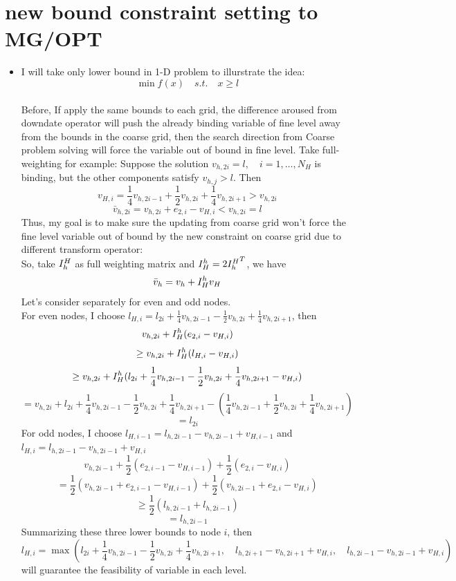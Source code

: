 \documentclass[10pt]{article}
\begin{document}
\section{new bound constraint setting to MG/OPT}
\begin{itemize}
\item I will take only lower bound in 1-D problem to illurstrate the idea: $$\min f(x)\quad  s.t. \quad x\geq l $$\\

Before,  If apply the same bounds to each grid, the difference aroused from downdate operator will push the already binding variable of fine level away from the bounds in the coarse grid, then the search direction from Coarse problem solving will force the variable out of bound in fine level. Take full-weighting for example: Suppose the solution $v_{h,2i}=l,\quad i=1,\dots,N_{H}$ is binding, but the other components satisfy $v_{h,j}>l$. Then 
$$v_{H,i}=\frac{1}{4}v_{h,2i-1}+\frac{1}{2}v_{h,2i}+\frac{1}{4}v_{h,2i+1}>v_{h,2i}$$
$$\bar v_{h,2i}=v_{h,2i}+e_{2,i}-v_{H,i}<v_{h,2i}=l$$
Thus, my goal is to make sure the updating from coarse grid won't force the fine level variable out of bound by the new constraint on coarse grid due to different transform operator:\\

So, take $I_h^H$ as full weighting matrix and $I_H^h=2{I_h^H}^{T}$, we have $$\bar v_h=v_h+I_H^h v_{H}$$  Let's consider separately for even and odd nodes.\\

For even nodes, I choose $l_{H,i}=l_{2i}+\frac{1}{4}v_{h,2i-1}-\frac{1}{2}v_{h,2i}+\frac{1}{4}v_{h,2i+1}$, then
$$v_{h,2i}+I_H^h(e_{2,i}-v_{H,i})$$
$$\geq v_{h,2i}+I_H^h(l_{H,i}-v_{H,i})$$
$$\geq v_{h,2i}+I_H^h(l_{2i}+\frac{1}{4}v_{h,2i-1}-\frac{1}{2}v_{h,2i}+\frac{1}{4} v_{h,2i+1}-v_{H,i})$$
$$= v_{h,2i}+l_{2i}+\frac{1}{4}v_{h,2i-1}-\frac{1}{2} v_{h,2i}+\frac{1}{4} v_{h,2i+1}-(\frac{1}{4}v_{h,2i-1}+\frac{1}{2} v_{h,2i}+\frac{1}{4} v_{h,2i+1})$$
$$=l_{2i}$$ 
For odd nodes, I choose $l_{H,i-1}=l_{h,2i-1}-v_{h,2i-1}+v_{H,i-1}$ and $l_{H,i}=l_{h,2i-1}-v_{h,2i-1}+v_{H,i}$
$$v_{h,2i-1}+\frac{1}{2}(e_{2,i-1}-v_{H,i-1})+\frac{1}{2}(e_{2,i}-v_{H,i})$$
$$=\frac{1}{2}(v_{h,2i-1}+e_{2,i-1}-v_{H,i-1})+\frac{1}{2}(v_{h,2i-1}+e_{2,i}-v_{H,i})$$
$$\geq \frac{1}{2}(l_{h,2i-1}+l_{h,2i-1})$$
$$=l_{h,2i-1}$$
Summarizing these three lower bounds to node $i$, then 
$$l_{H,i}=\max(l_{2i}+\frac{1}{4}v_{h,2i-1}-\frac{1}{2}v_{h,2i}+\frac{1}{4}v_{h,2i+1},\quad l_{h,2i+1}-v_{h,2i+1}+v_{H,i} ,\quad l_{h,2i-1}-v_{h,2i-1}+v_{H,i})$$
 will guarantee the feasibility of variable in each level.\\


\end{itemize}
\end{document}
